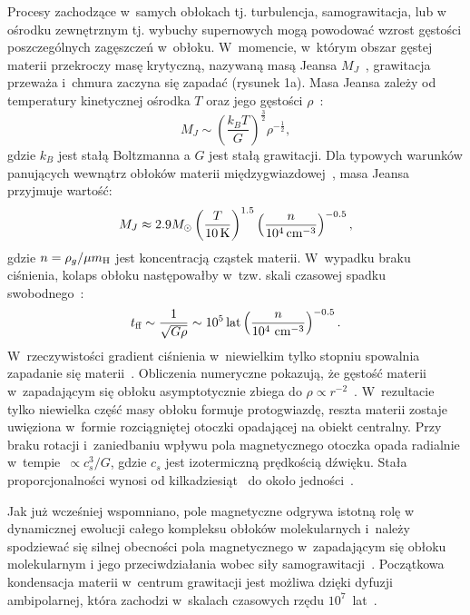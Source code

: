 \par Procesy zachodzące w~samych obłokach tj. turbulencja, samograwitacja, lub
w ośrodku zewnętrznym tj.  wybuchy supernowych mogą powodować wzrost gęstości
poszczególnych zagęszczeń w~obłoku. W~momencie, w~którym obszar gęstej materii
przekroczy  masę krytyczną, nazywaną masą Jeansa $M_J$~\cite{J1902, J1928},
grawitacja przeważa i~chmura zaczyna się zapadać (rysunek 1a). Masa Jeansa
zależy od temperatury kinetycznej ośrodka $T$ oraz jego gęstości
$\rho$~\cite{H64}:
%
\begin{equation} M_J \sim
   \left( \frac{k_B T}{G} \right) ^\frac{3}{2} {\rho}^{-\frac{1}{2}},
\end{equation}
%
gdzie $k_B$ jest stałą Boltzmanna a $G$ jest stałą grawitacji.
Dla typowych warunków panujących wewnątrz obłoków materii
międzygwiazdowej~\cite{BM89}, masa Jeansa przyjmuje wartość:
%
\begin{equation}
 M_J \approx 2.9 M_{\odot} \left(\frac{T}{10\hbox{$\thinspace\textrm{K}$}}\right)^{1.5} 
 \left(\frac{n}{10^4\hbox{$\thinspace\textrm{cm}$}^{-3}}\right)^{-0.5},
\end{equation}
%
gdzie $n = \rho_g / \mu \hbox{$m_{\textrm{H}}$}$ jest koncentracją cząstek materii.
W~wypadku braku ciśnienia, kolaps obłoku następowałby w~tzw. skali czasowej
spadku swobodnego~\cite{Spitzer1978}:
%
\begin{equation}
   t_{\textrm{ff}} \sim \frac{1}{\sqrt{G\rho}} \sim 10^5\hbox{$\thinspace\textrm{lat}$}
   \left(\frac{n}{10^4\thinspace \hbox{$\thinspace\textrm{cm}$}^{-3}}\right)^{-0.5}.
\end{equation}
%
W~rzeczywistości gradient ciśnienia w~niewielkim tylko stopniu spowalnia
zapadanie się materii~\cite{T82}. Obliczenia numeryczne pokazują, że gęstość
materii w~zapadającym się obłoku asymptotycznie zbiega do $\rho \propto
r^{-2}$~\cite{L69}. W~rezultacie tylko niewielka część masy obłoku formuje
protogwiazdę, reszta materii zostaje uwięziona w~formie rozciągniętej otoczki
opadającej na obiekt centralny. Przy braku rotacji i~zaniedbaniu wpływu pola
magnetycznego otoczka opada radialnie w~tempie~$\propto c_s^3 / G$, gdzie
$c_s$ jest izotermiczną prędkością dźwięku. Stała proporcjonalności wynosi od
kilkadziesiąt~\cite{H77} do około jedności~\cite{S77}.
\par Jak już wcześniej wspomniano, pole magnetyczne odgrywa istotną rolę w
dynamicznej ewolucji całego kompleksu obłoków molekularnych i~należy spodziewać
się silnej obecności pola magnetycznego w~zapadającym się obłoku molekularnym i
jego przeciwdziałania wobec siły samograwitacji~\cite{MC99}. Początkowa
kondensacja materii w~centrum grawitacji jest możliwa dzięki dyfuzji
ambipolarnej, która zachodzi w~skalach czasowych rzędu $10^7$~lat~\cite{MZGH93}.
